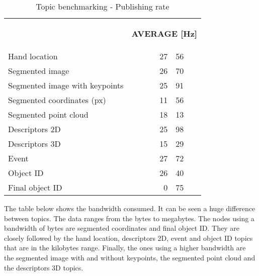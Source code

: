 \begin{itemize}
\begin{table}[H]
\centering
\begin{tabular} {l c r@{.}l }
\toprule
\addlinespace[3mm]
   \multicolumn{1}{c}{\begin{center}\textbf{TOPIC}\end{center}} &
   \multicolumn{3}{c}{\begin{center}\textbf{AVERAGE [Hz]}\end{center}} &\\
\addlinespace[-3mm]
\midrule
 Hand location && 27&56 \\
 Segmented  image & & 26&70 \\
 Segmented  image  with  keypoints & &25&91 \\
 Segmented  coordinates  (px) & &11&56 \\
 Segmented  point  cloud & &18&13 \\
 Descriptors  2D && 25&98 \\
 Descriptors  3D & &15&29 \\
Event && 27&72 \\
 Object ID && 26&40 \\
 Final  object  ID && 0&75 \\
\bottomrule
\end{tabular}
\caption[Topic benchmarking - Publishing rate]{Topic benchmarking - Publishing rate}
\label{hz}
\end{table}



			The table below shows the bandwidth consumed. 
			It can be seen a huge difference between topics. 
			The data ranges from the bytes to megabytes. 
			The nodes using a bandwidth of bytes are segmented coordinates and final object ID. 
			They are closely followed by the hand location, descriptors 2D, event and object ID topics that are in the kilobytes range. 
			Finally, the ones using a higher bandwidth are the segmented image with and without keypoints, the segmented point cloud and the descriptors 3D topics. 







\end{itemize}
